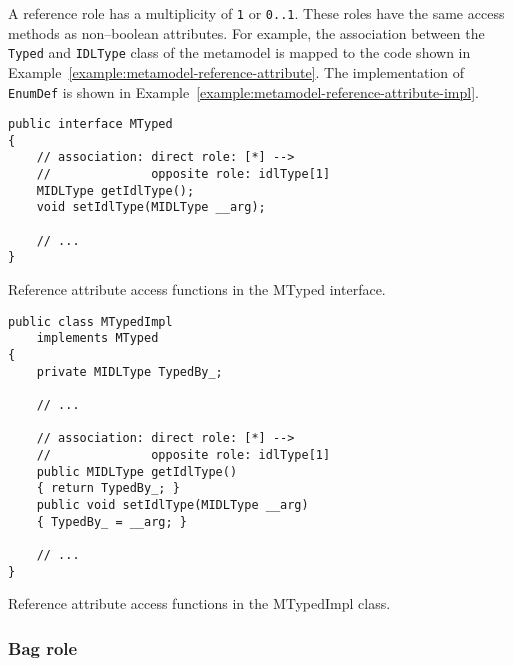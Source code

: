 A reference role has a multiplicity of {\tt 1} or {\tt 0..1}. These roles have
the same access methods as non--boolean attributes. For example, the association
between the {\tt Typed} and {\tt IDLType} class of the metamodel is mapped to
the code shown in Example~\ref{example:metamodel-reference-attribute}. The
implementation of {\tt EnumDef} is shown in
Example~\ref{example:metamodel-reference-attribute-impl}.

\begin{Example}
\begin{minifbox}
\begin{small}
\begin{verbatim}
public interface MTyped
{
    // association: direct role: [*] -->
    //              opposite role: idlType[1]
    MIDLType getIdlType();
    void setIdlType(MIDLType __arg);

    // ...
}
\end{verbatim}
\end{small}
\end{minifbox}
\caption{Reference attribute access functions in the MTyped interface.}
\label{example:metamodel-reference-attribute}
\end{Example}

\begin{Example}
\begin{minifbox}
\begin{small}
\begin{verbatim}
public class MTypedImpl
    implements MTyped
{
    private MIDLType TypedBy_;

    // ...

    // association: direct role: [*] -->
    //              opposite role: idlType[1]
    public MIDLType getIdlType()
    { return TypedBy_; }
    public void setIdlType(MIDLType __arg)
    { TypedBy_ = __arg; }

    // ...
}
\end{verbatim}
\end{small}
\end{minifbox}
\caption{Reference attribute access functions in the MTypedImpl class.}
\label{example:metamodel-reference-attribute-impl}
\end{Example}

\subsubsection{Bag role}

